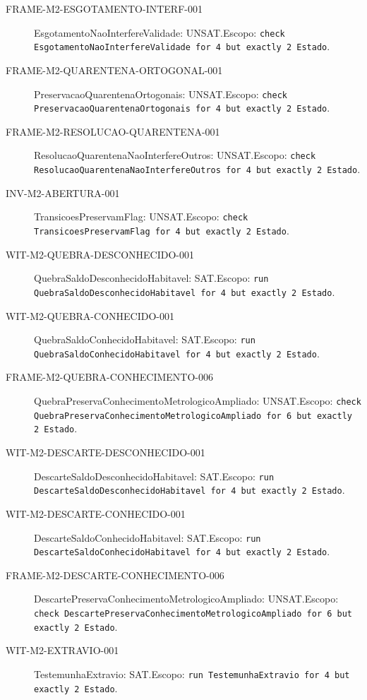 \begin{description}
\item[FRAME-M2-ESGOTAMENTO-INTERF-001] EsgotamentoNaoInterfereValidade: UNSAT.\newline Escopo: \texttt{check EsgotamentoNaoInterfereValidade for 4 but exactly 2 Estado}.
\item[FRAME-M2-QUARENTENA-ORTOGONAL-001] PreservacaoQuarentenaOrtogonais: UNSAT.\newline Escopo: \texttt{check PreservacaoQuarentenaOrtogonais for 4 but exactly 2 Estado}.
\item[FRAME-M2-RESOLUCAO-QUARENTENA-001] ResolucaoQuarentenaNaoInterfereOutros: UNSAT.\newline Escopo: \texttt{check ResolucaoQuarentenaNaoInterfereOutros for 4 but exactly 2 Estado}.
\item[INV-M2-ABERTURA-001] TransicoesPreservamFlag: UNSAT.\newline Escopo: \texttt{check TransicoesPreservamFlag for 4 but exactly 2 Estado}.
\item[WIT-M2-QUEBRA-DESCONHECIDO-001] QuebraSaldoDesconhecidoHabitavel: SAT.\newline Escopo: \texttt{run QuebraSaldoDesconhecidoHabitavel for 4 but exactly 2 Estado}.
\item[WIT-M2-QUEBRA-CONHECIDO-001] QuebraSaldoConhecidoHabitavel: SAT.\newline Escopo: \texttt{run QuebraSaldoConhecidoHabitavel for 4 but exactly 2 Estado}.
\item[FRAME-M2-QUEBRA-CONHECIMENTO-006] QuebraPreservaConhecimentoMetrologicoAmpliado: UNSAT.\newline Escopo: \texttt{check QuebraPreservaConhecimentoMetrologicoAmpliado for 6 but exactly 2 Estado}.
\item[WIT-M2-DESCARTE-DESCONHECIDO-001] DescarteSaldoDesconhecidoHabitavel: SAT.\newline Escopo: \texttt{run DescarteSaldoDesconhecidoHabitavel for 4 but exactly 2 Estado}.
\item[WIT-M2-DESCARTE-CONHECIDO-001] DescarteSaldoConhecidoHabitavel: SAT.\newline Escopo: \texttt{run DescarteSaldoConhecidoHabitavel for 4 but exactly 2 Estado}.
\item[FRAME-M2-DESCARTE-CONHECIMENTO-006] DescartePreservaConhecimentoMetrologicoAmpliado: UNSAT.\newline Escopo: \texttt{check DescartePreservaConhecimentoMetrologicoAmpliado for 6 but exactly 2 Estado}.
\item[WIT-M2-EXTRAVIO-001] TestemunhaExtravio: SAT.\newline Escopo: \texttt{run TestemunhaExtravio for 4 but exactly 2 Estado}.

\end{description}
